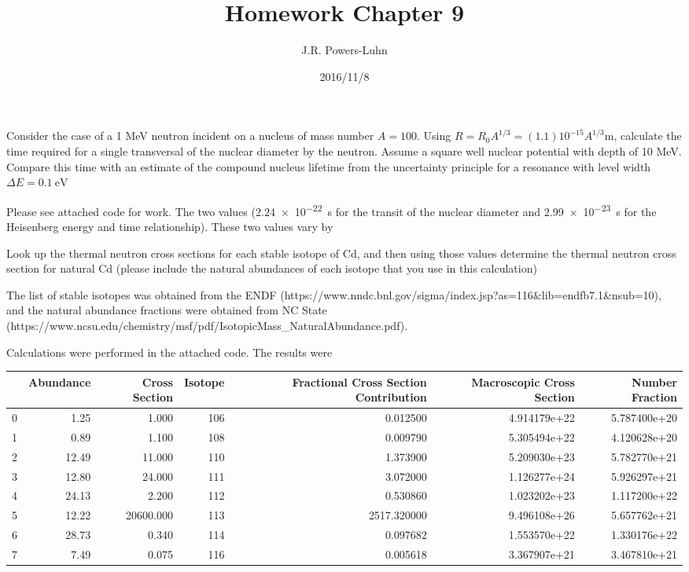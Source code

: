 \documentclass{hw}
\author{J.R. Powers-Luhn}
\date{2016/11/8}
\title{Homework Chapter 9}
\begin{document}
Consider the case of a 1 MeV neutron incident on a nucleus of mass number $A = 100$. Using $R=R_0 A^{1/3}=(1.1)10^{-15} A^{1/3}$m, calculate the time required for a single transversal of the nuclear diameter by the neutron. Assume a square well nuclear potential with depth of 10 MeV. Compare this time with an estimate of the compound nucleus lifetime from the uncertainty principle for a resonance with level width $\Delta E=\SI{0.1}{\electronvolt}$

\solution
Please see attached code for work. The two values (\SI{2.24e-22}{\second} for the transit of the nuclear diameter and \SI{2.99e-23}{\second} for the Heisenberg energy and time relationship). These two values vary by 

\problem{}
Look up the thermal neutron cross sections for each stable isotope of Cd, and then using those
values determine the thermal neutron cross section for natural Cd (please include the natural
abundances of each isotope that you use in this calculation)

\solution
The list of stable isotopes was obtained from the ENDF (https://www.nndc.bnl.gov/sigma/index.jsp?as=116\&lib=endfb7.1\&nsub=10), and the natural abundance fractions were obtained from NC State (https://www.ncsu.edu/chemistry/msf/pdf/IsotopicMass_NaturalAbundance.pdf).

Calculations were performed in the attached code. The results were

\begin{tabular}{lrrrrrr}
\toprule
{} &  Abundance &  Cross Section &  Isotope &  Fractional Cross Section Contribution &  Macroscopic Cross Section &  Number Fraction \\
\midrule
0 &       1.25 &          1.000 &      106 &                               0.012500 &               4.914179e+22 &     5.787400e+20 \\
1 &       0.89 &          1.100 &      108 &                               0.009790 &               5.305494e+22 &     4.120628e+20 \\
2 &      12.49 &         11.000 &      110 &                               1.373900 &               5.209030e+23 &     5.782770e+21 \\
3 &      12.80 &         24.000 &      111 &                               3.072000 &               1.126277e+24 &     5.926297e+21 \\
4 &      24.13 &          2.200 &      112 &                               0.530860 &               1.023202e+23 &     1.117200e+22 \\
5 &      12.22 &      20600.000 &      113 &                            2517.320000 &               9.496108e+26 &     5.657762e+21 \\
6 &      28.73 &          0.340 &      114 &                               0.097682 &               1.553570e+22 &     1.330176e+22 \\
7 &       7.49 &          0.075 &      116 &                               0.005618 &               3.367907e+21 &     3.467810e+21 \\
\bottomrule
\end{tabular}
\end{document}
